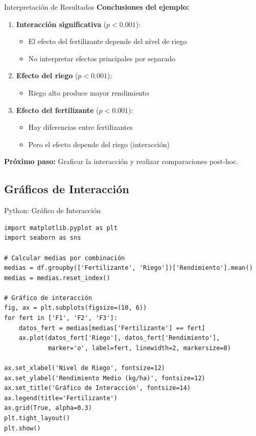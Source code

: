 \documentclass[aspectratio=169]{beamer}
\begin{document}
\begin{frame}{Interpretación de Resultados}
\textbf{Conclusiones del ejemplo:}

\begin{enumerate}
\item \textbf{Interacción significativa} ($p < 0.001$):
\begin{itemize}
\item El efecto del fertilizante depende del nivel de riego
\item No interpretar efectos principales por separado
\end{itemize}

\vspace{0.2cm}

\item \textbf{Efecto del riego} ($p < 0.001$):
\begin{itemize}
\item Riego alto produce mayor rendimiento
\end{itemize}

\vspace{0.2cm}

\item \textbf{Efecto del fertilizante} ($p < 0.001$):
\begin{itemize}
\item Hay diferencias entre fertilizantes
\item Pero el efecto depende del riego (interacción)
\end{itemize}
\end{enumerate}

\vspace{0.2cm}
\textbf{Próximo paso:} Graficar la interacción y realizar comparaciones post-hoc.
\end{frame}

\subsection{Gráficos de Interacción}

\begin{frame}[fragile]{Python: Gráfico de Interacción}
\small
\begin{verbatim}
import matplotlib.pyplot as plt
import seaborn as sns

# Calcular medias por combinación
medias = df.groupby(['Fertilizante', 'Riego'])['Rendimiento'].mean()
medias = medias.reset_index()

# Gráfico de interacción
fig, ax = plt.subplots(figsize=(10, 6))
for fert in ['F1', 'F2', 'F3']:
    datos_fert = medias[medias['Fertilizante'] == fert]
    ax.plot(datos_fert['Riego'], datos_fert['Rendimiento'],
            marker='o', label=fert, linewidth=2, markersize=8)

ax.set_xlabel('Nivel de Riego', fontsize=12)
ax.set_ylabel('Rendimiento Medio (kg/ha)', fontsize=12)
ax.set_title('Gráfico de Interacción', fontsize=14)
ax.legend(title='Fertilizante')
ax.grid(True, alpha=0.3)
plt.tight_layout()
plt.show()
\end{verbatim}
\end{frame}
\end{document}

